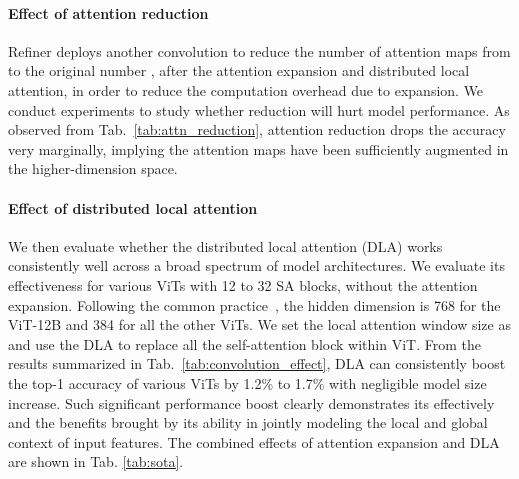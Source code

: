 \vspace{-2mm}
\paragraph{Effect of attention   reduction} Refiner  deploys another  convolution to reduce the number of attention maps from  to the original number ,  after the attention expansion and distributed local attention, in order to reduce the computation overhead due to expansion. We conduct experiments to study whether reduction will hurt model performance.  As observed from Tab.~\ref{tab:attn_reduction}, attention reduction   drops the accuracy very marginally, implying the attention maps have been sufficiently augmented in the higher-dimension space. 

\vspace{-2mm}
\paragraph{Effect of distributed local attention} We then evaluate whether the distributed local attention (DLA)    works consistently well across a broad spectrum of model architectures. We evaluate its effectiveness for various ViTs with 12 to 32 SA blocks, without the attention expansion. Following the common practice~\cite{dosovitskiy2020image}, the hidden dimension is 768 for the ViT-12B and 384 for all the other ViTs.   We set the local attention window size as  and use the DLA to replace all the self-attention block within ViT. From the results   summarized in Tab.~\ref{tab:convolution_effect}, DLA  can consistently boost the top-1 accuracy of various ViTs by 1.2\% to 1.7\% with negligible model size increase. Such significant performance boost clearly demonstrates  its effectively and the benefits brought by its ability in  jointly modeling the local and global context of input features. The combined effects of attention expansion and DLA are shown in Tab. \ref{tab:sota}.


